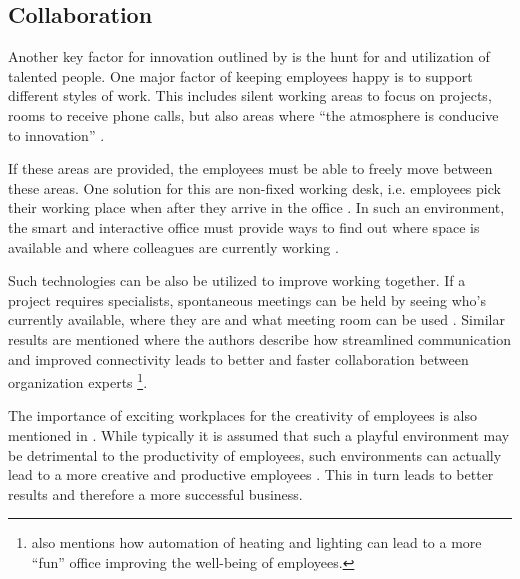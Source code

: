 \subsection{Collaboration}\label{sec:collaboration}
Another key factor for innovation outlined by \cite{hub13} is the hunt for and utilization of talented people. One major factor of keeping employees happy is to support different styles of work. This includes silent working areas to focus on projects, rooms to receive phone calls, but also areas where ``the atmosphere is conducive to innovation'' \cite{tieto}.

If these areas are provided, the employees must be able to freely move between these areas. One solution for this are non-fixed working desk, i.e. employees pick their working place when after they arrive in the office . In such an environment, the smart and interactive office must provide ways to find out where space is available and where colleagues are currently working \cite{tieto}.

Such technologies can be also be utilized to improve working together. If a project requires specialists, spontaneous meetings can be held by seeing who's currently available, where they are and what meeting room can be used \cite{tieto}. Similar results are mentioned \cite{hbcommunications} where the authors describe how streamlined communication and improved connectivity leads to better and faster collaboration between organization experts \footnote{\cite{hbcommunications} also mentions how automation of heating and lighting can lead to a more ``fun'' office improving the well-being of employees.}.

The importance of exciting workplaces for the creativity of employees is also mentioned in \cite{roomzilla3}. While typically it is assumed that such a playful environment may be detrimental to the productivity of employees, such environments can actually lead to a more creative and productive employees \cite{metroffice}. This in turn leads to better results and therefore a more successful business.



